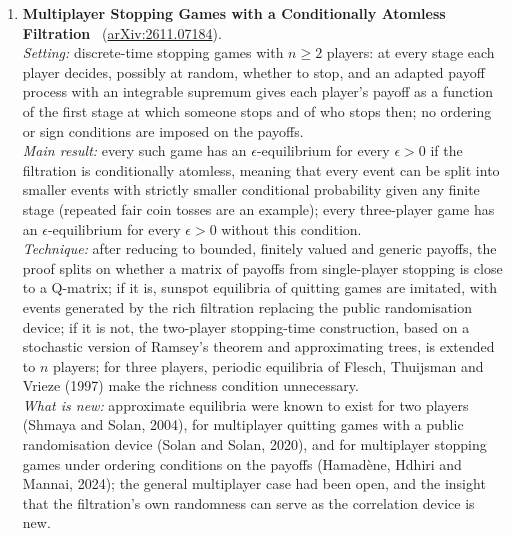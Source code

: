 \documentclass[11pt,a4paper]{article}
\begin{document}
\begin{enumerate}[leftmargin=*]
  \emph{Limitations:} the condition is only sufficient; the hypothesis that the quadratic brackets themselves are small-time reachable is the hard part and has to be proved case by case; the finite-dimensionality condition is technical; the examples are hand computations in dimension three and four, and the discussion of partial differential equations is heuristic.\\
  \emph{Verdict:} a structural theorem that changes what can be proved about small-time global controllability with drift, isolating quadratic brackets as the only obstruction once a rank condition holds; confidence high (full text).
  \item \textbf{Multiplayer Stopping Games with a Conditionally Atomless Filtration}~\cite{simon2026multiplayer} (\href{https://arxiv.org/abs/2611.07184}{arXiv:2611.07184}).\\
  \emph{Setting:} discrete-time stopping games with $n \ge 2$ players: at every stage each player decides, possibly at random, whether to stop, and an adapted payoff process with an integrable supremum gives each player's payoff as a function of the first stage at which someone stops and of who stops then; no ordering or sign conditions are imposed on the payoffs.\\
  \emph{Main result:} every such game has an $\epsilon$-equilibrium for every $\epsilon > 0$ if the filtration is conditionally atomless, meaning that every event can be split into smaller events with strictly smaller conditional probability given any finite stage (repeated fair coin tosses are an example); every three-player game has an $\epsilon$-equilibrium for every $\epsilon > 0$ without this condition.\\
  \emph{Technique:} after reducing to bounded, finitely valued and generic payoffs, the proof splits on whether a matrix of payoffs from single-player stopping is close to a Q-matrix; if it is, sunspot equilibria of quitting games are imitated, with events generated by the rich filtration replacing the public randomisation device; if it is not, the two-player stopping-time construction, based on a stochastic version of Ramsey's theorem and approximating trees, is extended to $n$ players; for three players, periodic equilibria of Flesch, Thuijsman and Vrieze (1997) make the richness condition unnecessary.\\
  \emph{What is new:} approximate equilibria were known to exist for two players (Shmaya and Solan, 2004), for multiplayer quitting games with a public randomisation device (Solan and Solan, 2020), and for multiplayer stopping games under ordering conditions on the payoffs (Hamad{\`e}ne, Hdhiri and Mannai, 2024); the general multiplayer case had been open, and the insight that the filtration's own randomness can serve as the correlation device is new.\\

\end{enumerate}
\end{document}
